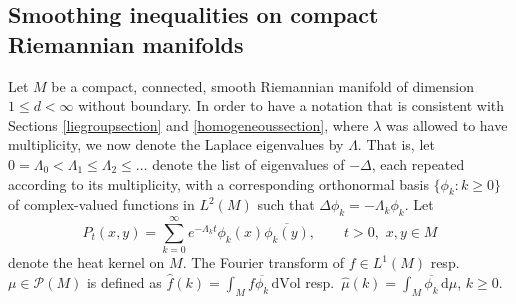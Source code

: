 \documentclass[11pt,a4paper]{article}
\theoremstyle{definition}
\begin{document}
\subsection{Smoothing inequalities on compact Riemannian manifolds}\label{manifoldsection}

Let $M$ be a compact, connected, smooth Riemannian manifold of dimension $1 \le d < \infty$ without boundary. In order to have a notation that is consistent with Sections \ref{liegroupsection} and \ref{homogeneoussection}, where $\lambda$ was allowed to have multiplicity, we now denote the Laplace eigenvalues by $\Lambda$. That is, let $0=\Lambda_0<\Lambda_1 \le \Lambda_2 \le \ldots$ denote the list of eigenvalues of $-\Delta$, each repeated according to its multiplicity, with a corresponding orthonormal basis $\{ \phi_k : k \ge 0 \}$ of complex-valued functions in $L^2(M)$ such that $\Delta \phi_k = - \Lambda_k \phi_k$. Let
\[ P_t (x,y) = \sum_{k=0}^{\infty} e^{-\Lambda_k t} \phi_k (x) \overline{\phi_k (y)}, \qquad t>0, \,\, x,y \in M \]
denote the heat kernel on $M$. The Fourier transform of $f \in L^1(M)$ resp.\ $\mu \in \mathcal{P}(M)$ is defined as $\widehat{f}(k)=\int_M f \overline{\phi_k} \, \mathrm{d} \mathrm{Vol}$ resp.\ $\widehat{\mu}(k)=\int_M \overline{\phi_k} \, \mathrm{d}\mu$, $k \ge 0$.
\end{document}
